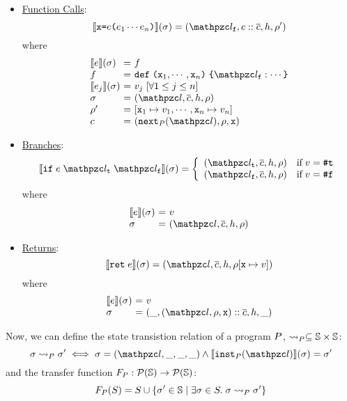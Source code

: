 \begin{itemize}
  \item \underline{Function Calls}:
    \[
      \sem{\varx \kweq \expr \kwrl \expr_1 \cdots \expr_n \kwrr}(\st) =
      (\lab_\varf, \ctxt :: \ctxts, \heap, \env')
    \]
    where
    \[
      \begin{array}{l@{~}c@{~}l}
        \sem{\expr}(\st) &=& \func\\
        \func &=& \kwdef \; \kwrl \varx_1, \cdots, \varx_n
        \kwrr \; \kwcl \lab_\varf: \cdots \kwcr\\
        \sem{\expr_j}(\st) &=& \val_j \;
        [\forall 1 \leq j \leq n]\\
        \st &=& (\lab, \ctxts, \heap, \env)\\
        \env' &=& [\varx_1 \mapsto \val_1, \cdots, \varx_n \mapsto \val_n]\\
        \ctxt &=& (\getnext{\prog}(\lab), \env, \varx)\\
      \end{array}
    \]

  \item \underline{Branches}:
    \[
      \sem{\kwif \; \expr \; \lab_\vart \; \lab_\varf}(\st) =
      \left\{
        \begin{array}{ll}
          (\lab_\vart, \ctxts, \heap, \env) & \text{if} \; \val = \true\\
          (\lab_\varf, \ctxts, \heap, \env) & \text{if} \; \val = \false\\
        \end{array}
      \right.
    \]
    where
    \[
      \begin{array}{l@{~}c@{~}l}
      \sem{\expr}(\st) &=& \val\\
      \st &=& (\lab, \ctxts, \heap, \env)\\
      \end{array}
    \]

  \item \underline{Returns}:
    \[
      \sem{\kwret \; \expr}(\st) = (\lab, \ctxts, \heap, \env[\varx \mapsto
      \val])
    \]
    where
    \[
      \begin{array}{l@{~}c@{~}l}
      \sem{\expr}(\st) &=& \val\\
      \st &=& (\_, (\lab, \env, \varx) :: \ctxts, \heap, \_)\\
      \end{array}
    \]
\end{itemize}

Now, we can define the state transistion relation
of a program $P$, $\leadsto_{P} \subseteq \mathbb{S} \times \mathbb{S}$:
\[
  \st \trans{\prog} \st' \iff
  \st = (\lab, \_, \_, \_) \wedge
  \sem{\getinst{\prog}(\lab)}(\st) = \st'
\]
and the transfer function $F_{P}: \mathcal{P}(\mathbb{S}) \rightarrow \mathcal{P}(\mathbb{S})$:
\[
  F_{P}(S) = S \cup \{ \sigma' \in \mathbb{S} \mid \exists \sigma \in S. \; \sigma \leadsto_{P} \sigma' \}
\]

